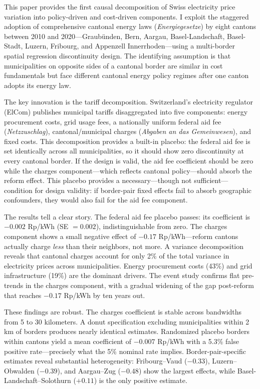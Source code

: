 \documentclass[12pt]{article}
\begin{document}
This paper provides the first causal decomposition of Swiss electricity price variation into policy-driven and cost-driven components. I exploit the staggered adoption of comprehensive cantonal energy laws (\textit{Energiegesetze}) by eight cantons between 2010 and 2020---Graubünden, Bern, Aargau, Basel-Landschaft, Basel-Stadt, Luzern, Fribourg, and Appenzell Innerrhoden---using a multi-border spatial regression discontinuity design. The identifying assumption is that municipalities on opposite sides of a cantonal border are similar in cost fundamentals but face different cantonal energy policy regimes after one canton adopts its energy law.

The key innovation is the tariff decomposition. Switzerland's electricity regulator (ElCom) publishes municipal tariffs disaggregated into five components: energy procurement costs, grid usage fees, a nationally uniform federal aid fee (\textit{Netzzuschlag}), cantonal/municipal charges (\textit{Abgaben an das Gemeinwesen}), and fixed costs. This decomposition provides a built-in placebo: the federal aid fee is set identically across all municipalities, so it should show zero discontinuity at every cantonal border. If the design is valid, the aid fee coefficient should be zero while the charges component---which reflects cantonal policy---should absorb the reform effect. This placebo provides a necessary---though not sufficient---condition for design validity: if border-pair fixed effects fail to absorb geographic confounders, they would also fail for the aid fee component.

The results tell a clear story. The federal aid fee placebo passes: its coefficient is $-0.002$ Rp/kWh (SE $= 0.002$), indistinguishable from zero. The charges component shows a small negative effect of $-0.17$ Rp/kWh---reform cantons actually charge \textit{less} than their neighbors, not more. A variance decomposition reveals that cantonal charges account for only 2\% of the total variance in electricity prices across municipalities. Energy procurement costs (43\%) and grid infrastructure (19\%) are the dominant drivers. The event study confirms flat pre-trends in the charges component, with a gradual widening of the gap post-reform that reaches $-0.17$ Rp/kWh by ten years out.

These findings are robust. The charges coefficient is stable across bandwidths from 5 to 30 kilometers. A donut specification excluding municipalities within 2 km of borders produces nearly identical estimates. Randomized placebo borders within cantons yield a mean coefficient of $-0.007$ Rp/kWh with a 5.3\% false positive rate---precisely what the 5\% nominal rate implies. Border-pair-specific estimates reveal substantial heterogeneity: Fribourg--Vaud ($-0.33$), Luzern--Obwalden ($-0.39$), and Aargau--Zug ($-0.48$) show the largest effects, while Basel-Landschaft--Solothurn ($+0.11$) is the only positive estimate.
\end{document}
